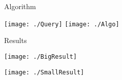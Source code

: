\documentclass[9pt,mathserif]{beamer}
\begin{document}

\begin{frame}[t]{Algorithm}
	\begin{center}
  	\texttt{[image: ./Query]}
  	\vspace{0.25cm}
  	\texttt{[image: ./Algo]}
  	\end{center}


\end{frame}

\begin{frame}[t]{Results}
	\begin{center}
  	\texttt{[image: ./BigResult]}
  	\end{center}
  	\begin{center}
  	\texttt{[image: ./SmallResult]}
  	\end{center}
\end{frame}
\end{document}
